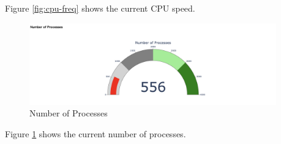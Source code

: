 \documentclass[11pt]{report}
\begin{document}
\newpage

Figure \ref{fig:cpu-freq} shows the current CPU speed. 

\begin{figure}[!htbp]
    \centering
    \includegraphics[width=0.95\textwidth]{figures/n-pids.png}
    \caption{Number of Processes}
    \label{fig:n-pids}
\end{figure}

Figure \ref{fig:n-pids} shows the current number of processes.
\end{document}
